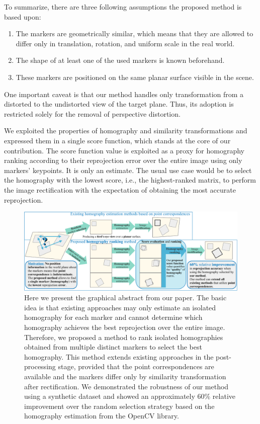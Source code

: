To summarize, there are three following assumptions the proposed method is based upon:
\begin{enumerate}
    \item The markers are geometrically similar, which means that they are allowed to differ only in translation, rotation, and uniform scale in the real world.
    \item The shape of at least one of the used markers is known beforehand.
    \item These markers are positioned on the same planar surface visible in the scene.
\end{enumerate}
One important caveat is that our method handles only transformation from a distorted to the undistorted view of the target plane. Thus, its adoption is restricted solely for the removal of perspective distortion.

We exploited the properties of homography and similarity transformations and expressed them in a single score function, which stands at the core of our contribution. The score function value is exploited as a proxy for homography ranking according to their reprojection error over the entire image using only markers' keypoints. It is only an estimate. The usual use case would be to select the homography with the lowest score, i.e., the highest-ranked matrix, to perform the image rectification with the expectation of obtaining the most accurate reprojection.

\begin{figure}[t]
    \centerline{\includegraphics[width=\linewidth]{figures/homography/graphical_abstract.pdf}}
    \caption[Graphical abstract for homography ranking]{Here we present the graphical abstract from our paper. The basic idea is that existing approaches may only estimate an isolated homography for each marker and cannot determine which homography achieves the best reprojection over the entire image. Therefore, we proposed a method to rank isolated homographies obtained from multiple distinct markers to select the best homography. This method extends existing approaches in the post-processing stage, provided that the point correspondences are available and the markers differ only by similarity transformation after rectification. We demonstrated the robustness of our method using a synthetic dataset and showed an approximately $60\%$ relative improvement over the random selection strategy based on the homography estimation from the OpenCV library.}
    \label{fig:GraphicalAbstract}
\end{figure}

